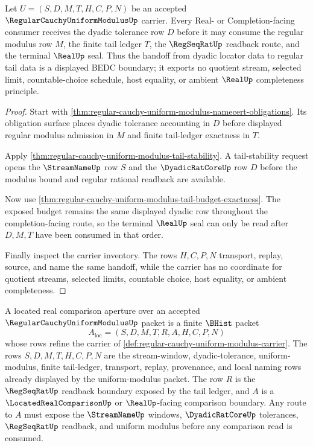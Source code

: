 \begin{theorem}
\label{thm:regular-cauchy-uniform-modulus-dyadic-locator-handoff}
Let $U=(S,D,M,T,H,C,P,N)$ be an accepted
$\RegularCauchyUniformModulusUp$ carrier. Every Real- or Completion-facing consumer receives the dyadic tolerance row $D$ before it may consume the regular modulus row $M$, the finite tail ledger $T$, the $\RegSeqRatUp$ readback route, and the terminal $\RealUp$ seal. Thus the handoff from dyadic locator data to regular tail data is a displayed BEDC boundary; it exports no quotient stream, selected limit, countable-choice schedule, host equality, or ambient $\RealUp$ completeness principle.
\end{theorem}
\begin{proof}
Start with \autoref{thm:regular-cauchy-uniform-modulus-namecert-obligations}. Its obligation surface places dyadic tolerance accounting in $D$ before displayed regular modulus admission in $M$ and finite tail-ledger exactness in $T$.

Apply \autoref{thm:regular-cauchy-uniform-modulus-tail-stability}. A tail-stability request opens the $\StreamNameUp$ row $S$ and the $\DyadicRatCoreUp$ row $D$ before the modulus bound and regular rational readback are available.

Now use \autoref{thm:regular-cauchy-uniform-modulus-tail-budget-exactness}. The exposed budget remains the same displayed dyadic row throughout the completion-facing route, so the terminal $\RealUp$ seal can only be read after $D,M,T$ have been consumed in that order.

Finally inspect the carrier inventory. The rows $H,C,P,N$ transport, replay, source, and name the same handoff, while the carrier has no coordinate for quotient streams, selected limits, countable choice, host equality, or ambient completeness.
\end{proof}

\begin{definition}
\label{def:located-real-comparison-aperture-carrier}
A located real comparison aperture over an accepted $\RegularCauchyUniformModulusUp$ packet is a finite $\BHist$ packet
$$
A_{\mathrm{loc}}=(S,D,M,T,R,A,H,C,P,N)
$$
whose rows refine the carrier of \autoref{def:regular-cauchy-uniform-modulus-carrier}. The rows $S,D,M,T,H,C,P,N$ are the stream-window, dyadic-tolerance, uniform-modulus, finite tail-ledger, transport, replay, provenance, and local naming rows already displayed by the uniform-modulus packet. The row $R$ is the $\RegSeqRatUp$ readback boundary exposed by the tail ledger, and $A$ is a $\LocatedRealComparisonUp$ or $\RealUp$-facing comparison boundary. Any route to $A$ must expose the $\StreamNameUp$ windows, $\DyadicRatCoreUp$ tolerances, $\RegSeqRatUp$ readback, and uniform modulus before any comparison read is consumed.
\end{definition}


